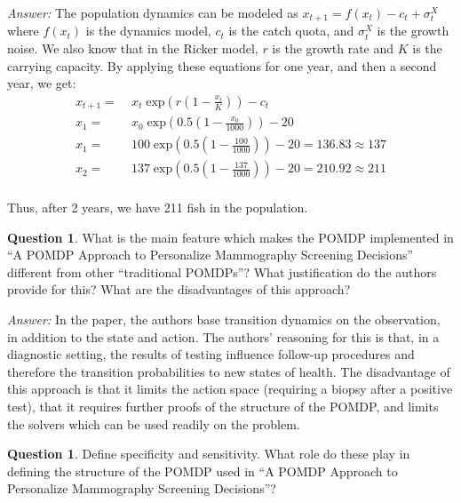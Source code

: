 \documentclass{article}
\theoremstyle{definition}
\newtheorem{question}[thm]{Question}
\newenvironment{answer}{\noindent\textit{Answer:}}{}
\begin{document}
\begin{answer}
    The population dynamics can be modeled as $x_{t+1} = f(x_t) - c_t + \sigma_t^X$ where $f(x_t)$ is the dynamics model, $c_t$ is the catch quota, and $\sigma_t^X$ is the growth noise. We also know that in the Ricker model, $r$ is the growth rate and $K$ is the carrying capacity. By applying these equations for one year, and then a second year, we get:
\\ \begin{equation*} \begin{aligned}
x_{t+1} =&\; x_t \;\text{exp}(r(1 - \frac{x_t}{K})) - c_t
\\ x_1 =&\; x_0 \;\text{exp}(0.5(1 - \frac{x_0}{1000})) - 20
\\ x_1 =&\; 100  \;\text{exp}(0.5(1 - \frac{100}{1000})) - 20 = 136.83 \approx 137
\\ x_2 =&\; 137 \;\text{exp}(0.5(1 - \frac{137}{1000})) - 20 = 210.92 \approx 211
\end{aligned} \end{equation*}
\\ Thus, after 2 years, we have 211 fish in the population.
\end{answer}

\begin{question}
What is the main feature which makes the POMDP implemented in “A POMDP Approach to Personalize Mammography Screening Decisions” different from other “traditional POMDPs”? What justification do the authors provide for this? What are the disadvantages of this approach?
\end{question}

\begin{answer}
In the paper, the authors base transition dynamics on the observation, in addition to the state and action. The authors’ reasoning for this is that, in a diagnostic setting, the results of testing influence follow-up procedures and therefore the transition probabilities to new states of health. The disadvantage of this approach is that it limits the action space (requiring a biopsy after a positive test), that it requires further proofs of the structure of the POMDP, and limits the solvers which can be used readily on the problem.
\end{answer}

\begin{question}
Define specificity and sensitivity. What role do these play in defining the structure of the POMDP used in “A POMDP Approach to Personalize Mammography Screening Decisions”?
\end{question}
\end{document}
